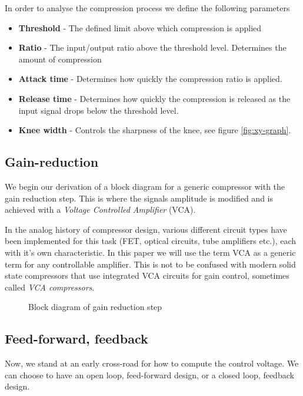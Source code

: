 \documentclass[]{article}
\begin{document}
In order to analyse the compression process we define the following parameters
\begin{itemize}
\item{\textbf{Threshold} - The defined limit above which compression is applied }
\item{\textbf{Ratio} - The input/output ratio above the threshold level. Determines the amount of compression}
\item{\textbf{Attack time} - Determines how quickly the compression ratio is applied.}
\item{\textbf{Release time} - Determines how quickly the compression is released as the input signal drops below the threshold level.}
\item{\textbf{Knee width} - Controls the sharpness of the knee, see figure \ref{fig:xy-graph}.}
\end{itemize}



\subsection{Gain-reduction}
We begin our derivation of a block diagram for a generic compressor with the gain reduction step. This is where the signals amplitude is modified and is achieved with a \emph{Voltage Controlled Amplifier} (VCA).

In the analog history of compressor design, various different circuit types have been implemented for this task (FET, optical circuits, tube amplifiers etc.), each with it's own characteristic. In this paper we will use the term VCA as a generic term for any controllable amplifier. This is not to be confused with modern solid state compressors that use integrated VCA circuits for gain control, sometimes called \emph{VCA compressors}.


\begin{figure}[ht]
\centering

\caption{Block diagram of gain reduction step} 
\label{fig:vca-generic-blockdiagram}
\end{figure}





\subsection{Feed-forward, feedback}
Now, we stand at an early cross-road for how to compute the control voltage. We can choose to have an open loop, feed-forward design, or a closed loop, feedback design.
\end{document}
